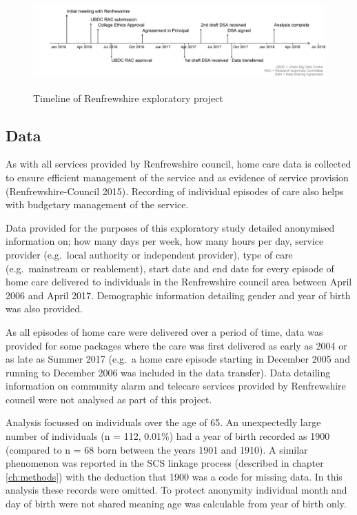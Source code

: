 \documentclass[]{article}
\begin{document}
\begin{figure}[h]
  \centering
    \caption{Timeline of Renfrewshire exploratory project}
    \includegraphics{figures/chapter-renf/renf-timeline.png}
    \label{fig:ren-timeline}
\end{figure}

\subsection{Data}\label{subsec:renf-methods-data}

As with all services provided by Renfrewshire council, home care data is
collected to ensure efficient management of the service and as evidence
of service provision (Renfrewshire-Council 2015). Recording of
individual episodes of care also helps with budgetary management of the
service.

Data provided for the purposes of this exploratory study detailed
anonymised information on; how many days per week, how many hours per
day, service provider (e.g.~local authority or independent provider),
type of care (e.g.~mainstream or reablement), start date and end date
for every episode of home care delivered to individuals in the
Renfrewshire council area between April 2006 and April 2017. Demographic
information detailing gender and year of birth was also provided.

As all episodes of home care were delivered over a period of time, data
was provided for some packages where the care was first delivered as
early as 2004 or as late as Summer 2017 (e.g.~a home care episode
starting in December 2005 and running to December 2006 was included in
the data transfer). Data detailing information on community alarm and
telecare services provided by Renfrewshire council were not analysed as
part of this project.

Analysis focussed on individuals over the age of 65. An unexpectedly
large number of individuals (n = 112, 0.01\%) had a year of birth
recorded as 1900 (compared to n = 68 born between the years 1901 and
1910). A similar phenomenon was reported in the SCS linkage process
(described in chapter \ref{ch:methods}) with the deduction that 1900 was
a code for missing data. In this analysis these records were omitted. To
protect anonymity individual month and day of birth were not shared
meaning age was calculable from year of birth only.
\end{document}
